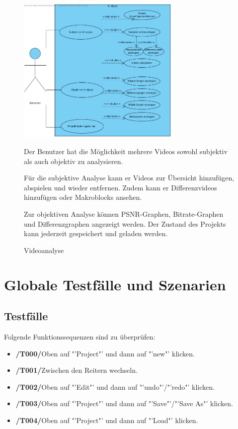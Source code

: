 \documentclass[parskip=full]{scrartcl}
\begin{document}
\begin{figure}[htbp]
{\centering
\includegraphics[width=0.7\textwidth]{UsecaseDiagrams/Analyse.png}
\caption{Videoanalyse} }

Der Benutzer hat die Möglichkeit mehrere Videos sowohl subjektiv als auch objektiv zu analysieren. 

Für die subjektive Analyse kann er Videos zur Übersicht hinzufügen, abspielen und wieder entfernen. Zudem kann er Differenzvideos hinzufügen oder Makroblocks ansehen.

Zur objektiven Analyse können PSNR-Graphen, Bitrate-Graphen und Differenzgraphen angezeigt werden.
Der Zustand des Projekts kann jederzeit gespeichert und geladen werden.

\end{figure}
\newpage
\section{Globale Testfälle und Szenarien}
\subsection{Testfälle}
Folgende Funktionssequenzen sind zu überprüfen:
\begin{itemize}
\item[]\textbf{/T000/}\qquad Oben auf "'Project"' und dann auf "'new"' klicken.
\item[]\textbf{/T001/}\qquad Zwischen den Reitern wechseln.
\item[]\textbf{/T002/}\qquad Oben auf "'Edit"' und dann auf "'undo"'/"'redo"' klicken.
\item[]\textbf{/T003/}\qquad Oben auf "'Project"' und dann auf "'Save"'/"'Save As"' klicken.
\item[]\textbf{/T004/}\qquad Oben auf "'Project"' und dann auf "'Load"' klicken.
\end{itemize}
\end{document}
